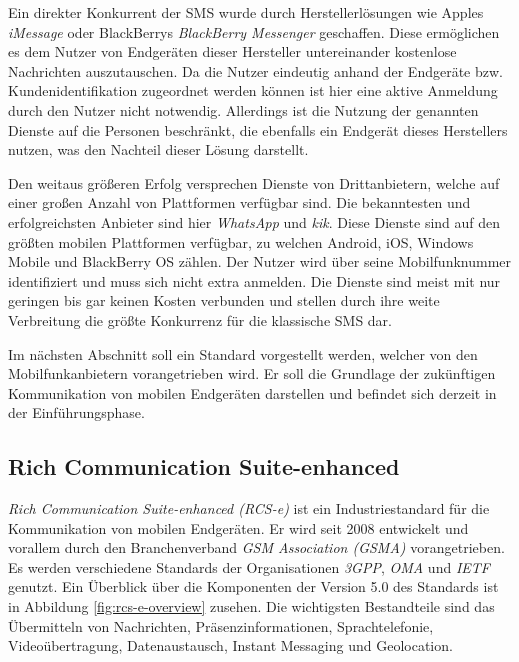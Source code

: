 \documentclass[german,12pt,a4paper]{article}
\begin{document}
 Ein direkter Konkurrent der SMS wurde durch Herstellerlösungen wie Apples \textit{iMessage} oder
 BlackBerrys \textit{BlackBerry Messenger} geschaffen. Diese ermöglichen es dem Nutzer von Endgeräten
 dieser Hersteller untereinander kostenlose Nachrichten auszutauschen. Da die Nutzer eindeutig
 anhand der Endgeräte bzw. Kundenidentifikation zugeordnet werden können ist hier eine aktive
 Anmeldung durch den Nutzer nicht notwendig. Allerdings ist die Nutzung der genannten Dienste auf die
 Personen beschränkt, die ebenfalls ein Endgerät dieses Herstellers nutzen, was den Nachteil dieser
 Lösung darstellt.

 Den weitaus größeren Erfolg versprechen Dienste von Drittanbietern, welche auf einer großen Anzahl
 von Plattformen verfügbar sind. Die bekanntesten und erfolgreichsten Anbieter sind hier
 \textit{WhatsApp} und \textit{kik}. Diese Dienste sind auf den größten mobilen Plattformen
 verfügbar, zu welchen Android, iOS, Windows Mobile und BlackBerry OS zählen. Der Nutzer wird über
 seine Mobilfunknummer identifiziert und muss sich nicht extra anmelden. Die Dienste sind meist mit
 nur geringen bis gar keinen Kosten verbunden und stellen durch ihre weite Verbreitung die größte
 Konkurrenz für die klassische SMS dar.

 Im nächsten Abschnitt soll ein Standard vorgestellt werden, welcher von den Mobilfunkanbietern
 vorangetrieben wird. Er soll die Grundlage der zukünftigen Kommunikation von mobilen Endgeräten
 darstellen und befindet sich derzeit in der Einführungsphase.


 \subsection{Rich Communication Suite-enhanced} %
 \label{sub:rcs-e}

 \textit{Rich Communication Suite-enhanced (RCS-e)} \cite{rcs} ist ein Industriestandard für die
  Kommunikation von mobilen Endgeräten. Er wird seit 2008 entwickelt und vorallem durch den
  Branchenverband \textit{GSM Association (GSMA)} vorangetrieben. Es werden verschiedene Standards der
  Organisationen \textit{3GPP}, \textit{OMA} und \textit{IETF} genutzt. Ein Überblick über die
  Komponenten der Version 5.0 des Standards ist in Abbildung \ref{fig:rcs-e-overview} zusehen.
  Die wichtigsten Bestandteile sind das Übermitteln von Nachrichten, Präsenzinformationen,
  Sprachtelefonie, Videoübertragung, Datenaustausch, Instant Messaging und Geolocation.
\end{document}
